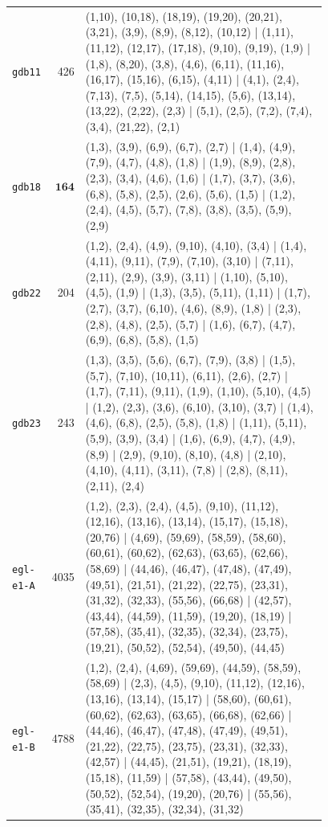\begin{landscape}
\begin{longtable}{lr>{\tiny\raggedright\arraybackslash}p{0.78\linewidth}}
\texttt{gdb11} & 426 & (1,10), (10,18), (18,19), (19,20), (20,21), (3,21), (3,9), (8,9), (8,12), (10,12) | (1,11), (11,12), (12,17), (17,18), (9,10), (9,19), (1,9) | (1,8), (8,20), (3,8), (4,6), (6,11), (11,16), (16,17), (15,16), (6,15), (4,11) | (4,1), (2,4), (7,13), (7,5), (5,14), (14,15), (5,6), (13,14), (13,22), (2,22), (2,3) | (5,1), (2,5), (7,2), (7,4), (3,4), (21,22), (2,1) \\[2pt]
\texttt{gdb18} & $\mathbf{164}$ & (1,3), (3,9), (6,9), (6,7), (2,7) | (1,4), (4,9), (7,9), (4,7), (4,8), (1,8) | (1,9), (8,9), (2,8), (2,3), (3,4), (4,6), (1,6) | (1,7), (3,7), (3,6), (6,8), (5,8), (2,5), (2,6), (5,6), (1,5) | (1,2), (2,4), (4,5), (5,7), (7,8), (3,8), (3,5), (5,9), (2,9) \\[2pt]
\texttt{gdb22} & 204 & (1,2), (2,4), (4,9), (9,10), (4,10), (3,4) | (1,4), (4,11), (9,11), (7,9), (7,10), (3,10) | (7,11), (2,11), (2,9), (3,9), (3,11) | (1,10), (5,10), (4,5), (1,9) | (1,3), (3,5), (5,11), (1,11) | (1,7), (2,7), (3,7), (6,10), (4,6), (8,9), (1,8) | (2,3), (2,8), (4,8), (2,5), (5,7) | (1,6), (6,7), (4,7), (6,9), (6,8), (5,8), (1,5) \\[2pt]
\texttt{gdb23} & 243 & (1,3), (3,5), (5,6), (6,7), (7,9), (3,8) | (1,5), (5,7), (7,10), (10,11), (6,11), (2,6), (2,7) | (1,7), (7,11), (9,11), (1,9), (1,10), (5,10), (4,5) | (1,2), (2,3), (3,6), (6,10), (3,10), (3,7) | (1,4), (4,6), (6,8), (2,5), (5,8), (1,8) | (1,11), (5,11), (5,9), (3,9), (3,4) | (1,6), (6,9), (4,7), (4,9), (8,9) | (2,9), (9,10), (8,10), (4,8) | (2,10), (4,10), (4,11), (3,11), (7,8) | (2,8), (8,11), (2,11), (2,4) \\[2pt]
\texttt{egl-e1-A} & 4035 & (1,2), (2,3), (2,4), (4,5), (9,10), (11,12), (12,16), (13,16), (13,14), (15,17), (15,18), (20,76) | (4,69), (59,69), (58,59), (58,60), (60,61), (60,62), (62,63), (63,65), (62,66), (58,69) | (44,46), (46,47), (47,48), (47,49), (49,51), (21,51), (21,22), (22,75), (23,31), (31,32), (32,33), (55,56), (66,68) | (42,57), (43,44), (44,59), (11,59), (19,20), (18,19) | (57,58), (35,41), (32,35), (32,34), (23,75), (19,21), (50,52), (52,54), (49,50), (44,45) \\[2pt]
\texttt{egl-e1-B} & 4788 & (1,2), (2,4), (4,69), (59,69), (44,59), (58,59), (58,69) | (2,3), (4,5), (9,10), (11,12), (12,16), (13,16), (13,14), (15,17) | (58,60), (60,61), (60,62), (62,63), (63,65), (66,68), (62,66) | (44,46), (46,47), (47,48), (47,49), (49,51), (21,22), (22,75), (23,75), (23,31), (32,33), (42,57) | (44,45), (21,51), (19,21), (18,19), (15,18), (11,59) | (57,58), (43,44), (49,50), (50,52), (52,54), (19,20), (20,76) | (55,56), (35,41), (32,35), (32,34), (31,32) \\[2pt]

\end{longtable}
\end{landscape}
